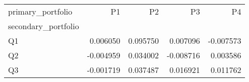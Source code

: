 \begin{tabular}{lrrrr}
\toprule
primary_portfolio & P1 & P2 & P3 & P4 \\
secondary_portfolio &  &  &  &  \\
\midrule
Q1 & 0.006050 & 0.095750 & 0.007096 & -0.007573 \\
Q2 & -0.004959 & 0.034002 & -0.008716 & 0.003586 \\
Q3 & -0.001719 & 0.037487 & 0.016921 & 0.011762 \\
\bottomrule
\end{tabular}
